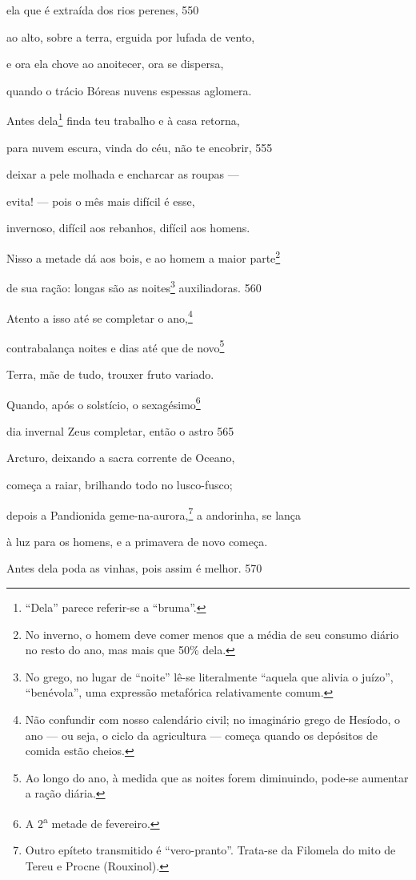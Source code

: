 ela que é extraída dos rios perenes, \num{550}

ao alto, sobre a terra, erguida por lufada de vento,

e ora ela chove ao anoitecer, ora se dispersa,

quando o trácio Bóreas nuvens espessas aglomera.

Antes dela\footnote{``Dela'' parece referir-se a ``bruma''.} finda teu trabalho e à casa retorna,

para nuvem escura, vinda do céu, não te encobrir, \num{555}

deixar a pele molhada e encharcar as roupas ---

evita! --- pois o mês mais difícil é esse,

invernoso, difícil aos rebanhos, difícil aos homens.

Nisso a metade dá aos bois, e ao homem a maior parte\footnote{No inverno, o homem deve comer menos que a média de seu consumo diário no resto do ano, mas mais que 50\% dela.}

de sua ração: longas são as noites\footnote{No grego, no lugar de ``noite'' lê-se literalmente ``aquela que alivia o juízo'', ``benévola'', uma expressão metafórica relativamente comum.} auxiliadoras. \num{560}

Atento a isso até se completar o ano,\footnote{Não confundir com nosso calendário civil; no imaginário grego de
Hesíodo, o ano --- ou seja, o ciclo da agricultura --- começa quando os
depósitos de comida estão cheios.}

contrabalança noites e dias até que de novo\footnote{Ao longo do ano, à medida que as noites forem diminuindo, pode-se aumentar a ração diária.}

Terra, mãe de tudo, trouxer fruto variado.

Quando, após o solstício, o sexagésimo\footnote{A 2\textsuperscript{a} metade de fevereiro.}

dia invernal Zeus completar, então o astro \num{565}

Arcturo, deixando a sacra corrente de Oceano,

começa a raiar, brilhando todo no lusco-fusco;

depois a Pandionida geme-na-aurora,\footnote{Outro epíteto transmitido é ``vero-pranto''. Trata-se da Filomela
do mito de Tereu e Procne (Rouxinol).} a andorinha, se \qb{}lança

à luz para os homens, e a primavera de novo começa.

Antes dela poda as vinhas, pois assim é melhor. \num{570}

